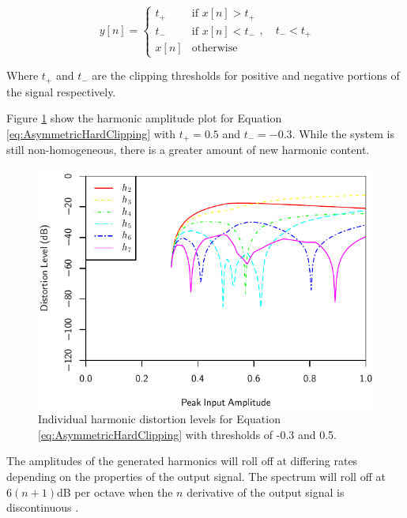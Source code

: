 			\begin{equation}
				y[n] = \begin{cases}
					t_{+} & \text{if $x[n] > t_{+}$} \\
					t_{-} & \text{if $x[n] < t_{-}$} \\
					x[n] & \text{otherwise}
				\end{cases}, \quad t_{-} < t_{+}
				\label{eq:AsymmetricHardClipping}
			\end{equation}

			Where $t_{+}$ and $t_{-}$ are the clipping thresholds for positive and negative portions of the
			signal respectively.	

			Figure \ref{fig:AsymmetricHardClippingHarmonics} show the harmonic amplitude plot for Equation
			\ref{eq:AsymmetricHardClipping} with $t_{+} = 0.5$ and $t_{-} = -0.3$. While the system is still
			non-homogeneous, there is a greater amount of new harmonic content.

			\begin{figure}[h!]
				\centering
				\includegraphics{chapter5/Images/AsymmetricHardClippingHarmonics.pdf}
				\caption{Individual harmonic distortion levels for Equation
					 \ref{eq:AsymmetricHardClipping} with thresholds of -0.3 and 0.5.}
				\label{fig:AsymmetricHardClippingHarmonics}
			\end{figure}

			The amplitudes of the generated harmonics will roll off at differing rates depending on the
			properties of the output signal. The spectrum will roll off at $6(n+1)$dB per octave when
			the $n$ derivative of the output signal is discontinuous \citep{kraght2000aliasing}.

